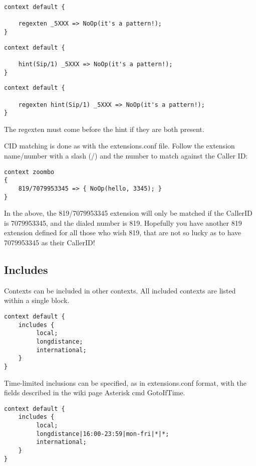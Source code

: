 {\begin{verbatim}
context default {

    regexten _5XXX => NoOp(it's a pattern!);
}
\end{verbatim}

\begin{verbatim}
context default {

    hint(Sip/1) _5XXX => NoOp(it's a pattern!);
}
\end{verbatim}

\begin{verbatim}
context default {

    regexten hint(Sip/1) _5XXX => NoOp(it's a pattern!);
}
\end{verbatim}

The regexten must come before the hint if they are both present.

CID matching is done as with the extensions.conf file. Follow the extension
name/number with a slash (/) and the number to match against the Caller ID:

\begin{verbatim}
context zoombo 
{
	819/7079953345 => { NoOp(hello, 3345); }
}
\end{verbatim}

In the above,  the 819/7079953345 extension will only be matched if the
CallerID is 7079953345, and the dialed number is 819. Hopefully you have
another 819 extension defined for all those who wish 819, that are not so lucky
as to have 7079953345 as their CallerID!


\subsection{Includes}

Contexts can be included in other contexts. All included contexts are
listed within a single block.

\begin{verbatim}
context default {
    includes {
         local;
         longdistance;
         international;
    }
}
\end{verbatim}

Time-limited inclusions can be specified, as in extensions.conf
format, with the fields described in the wiki page Asterisk cmd
GotoIfTime.

\begin{verbatim}
context default {
    includes {
         local;
         longdistance|16:00-23:59|mon-fri|*|*;
         international;
    }
}
\end{verbatim}

}
